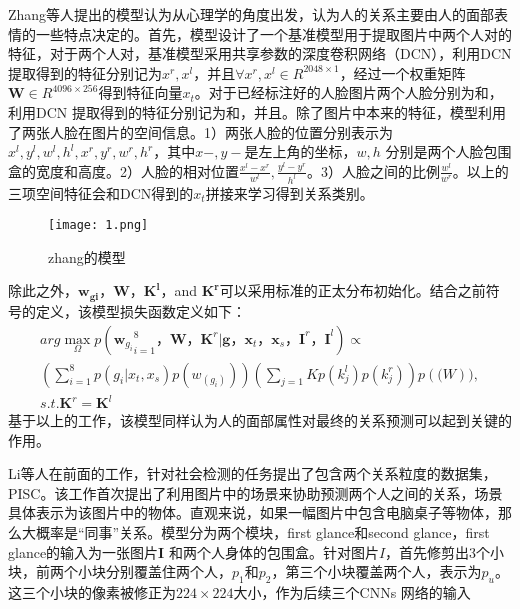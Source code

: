 Zhang等人提出的模型认为从心理学的角度出发，认为人的关系主要由人的面部表情的一些特点决定的。首先，模型设计了一个基准模型用于提取图片中两个人对的特征，对于两个人对，基准模型采用共享参数的深度卷积网络（DCN），利用DCN提取得到的特征分别记为$x^r,x^l$，并且$\forall x^r,x^l \in R^{2048 \times 1}$，经过一个权重矩阵$\mathbf{W} \in R^{4096 \times 256}$得到特征向量$x_t$。对于已经标注好的人脸图片两个人脸分别为和，利用DCN 提取得到的特征分别记为和，并且。除了图片中本来的特征，模型利用了两张人脸在图片的空间信息。1）两张人脸的位置分别表示为${x^l,y^l,w^l,h^l,x^r,y^r,w^r,h^r}$，其中$x-,y-$是左上角的坐标，$w,h$ 分别是两个人脸包围盒的宽度和高度。2）人脸的相对位置$\frac{x^l-x^r}{w^l},\frac{y^l-y^r}{h^l}$。3）人脸之间的比例$\frac{w^l}{w^r}$。以上的三项空间特征会和DCN得到的$x_t$拼接来学习得到关系类别。
\begin{figure}[htpb]
	\centering
	\texttt{[image: 1.png]}
    \caption{zhang的模型}
	\vspace*{-3.5mm}
	\label{fig:model_zhang}
\end{figure}
除此之外，$\mathbf{w_{gi}}$，$\mathbf{W}$，$\mathbf{K^l}$，and $\mathbf{K^r}$可以采用标准的正太分布初始化。结合之前符号的定义，该模型损失函数定义如下：
\begin{equation}
\begin{split}
     arg\max \limits_{\Omega} p({\mathbf{w}_{g_i}}_{i=1}^8， \mathbf{W}，\mathbf{K}^r | \mathbf{g}，\mathbf{x}_t，\mathbf{x}_s，\mathbf{I}^r，\mathbf{I}^l) \propto \\
     (\sum_{i=1}^{8}p(g_i|x_t,x_s)p(w_(g_i)))(\sum_{j=1}{K}p(k_j^l)p(k_j^r))p(\mathbf(W)), \\
     s.t. \mathbf{K}^r = \mathbf{K}^l
\end{split}
\end{equation}
基于以上的工作，该模型同样认为人的面部属性对最终的关系预测可以起到关键的作用。

Li等人\cite{DBLP:conf/iccv/LiWZK17}在前面的工作，针对社会检测的任务提出了包含两个关系粒度的数据集，PISC\cite{DBLP:conf/iccv/LiWZK17}。该工作首次提出了利用图片中的场景来协助预测两个人之间的关系，场景具体表示为该图片中的物体。直观来说，如果一幅图片中包含电脑桌子等物体，那么大概率是``同事''关系。模型分为两个模块，first glance和second glance，first glance的输入为一张图片$\mathbf{I}$ 和两个人身体的包围盒。针对图片$I$，首先修剪出3个小块，前两个小块分别覆盖住两个人，$p_1$和$p_2$，第三个小块覆盖两个人，表示为$p_{u}$。这三个小块的像素被修正为$224 \times 224$大小，作为后续三个CNNs 网络的输入

